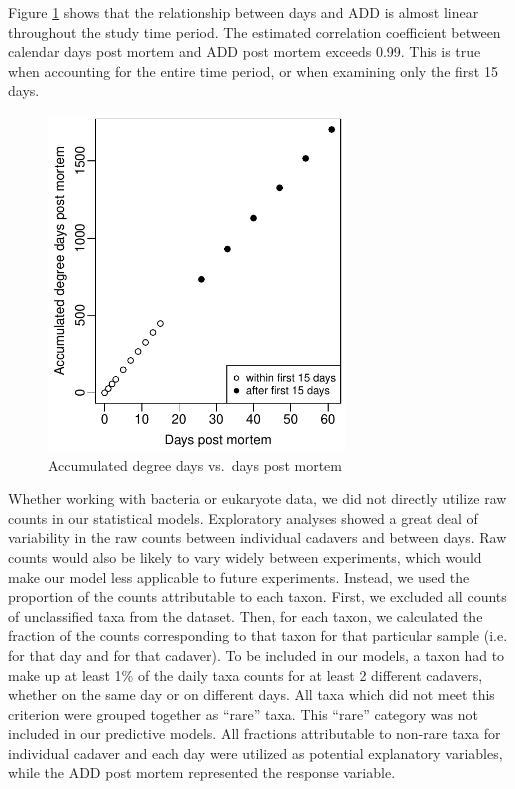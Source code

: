\documentclass{article}
\begin{document}
Figure \ref{fig:degdays_vs_days} shows that the relationship between
days and ADD is almost linear throughout the study time period.  The
estimated correlation coefficient between calendar days post mortem
and ADD post mortem exceeds 0.99.  This is true when accounting for
the entire time period, or when examining only the first 15 days.
\begin{figure}[hb]
  \centering
  \includegraphics[height=3.5in]{degdays_vs_days}
  \caption{Accumulated degree days vs.~days post mortem}
  \label{fig:degdays_vs_days}
\end{figure}

Whether working with bacteria or eukaryote data, we did not directly
utilize raw counts in our statistical models.  Exploratory analyses
showed a great deal of variability in the raw counts between
individual cadavers and between days.  Raw counts would also be likely
to vary widely between experiments, which would make our model less
applicable to future experiments.  Instead, we used the proportion of
the counts attributable to each taxon.  First, we excluded all counts
of unclassified taxa from the dataset.  Then, for each taxon, we
calculated the fraction of the counts corresponding to that taxon for
that particular sample (i.e. for that day and for that cadaver).  To
be included in our models, a taxon had to make up at least 1\% of the
daily taxa counts for at least 2 different cadavers, whether on the
same day or on different days.  All taxa which did not meet this
criterion were grouped together as ``rare'' taxa.  This ``rare''
category was not included in our predictive models.  All fractions
attributable to non-rare taxa for individual cadaver and each day were
utilized as potential explanatory variables, while the ADD post mortem
represented the response variable.
\end{document}
